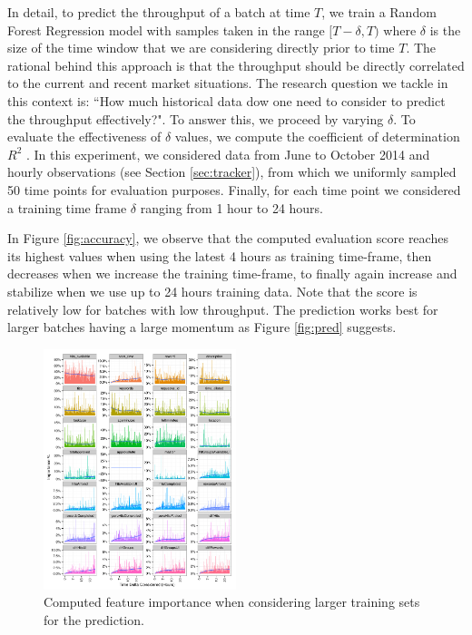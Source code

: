 In detail, to predict the throughput of a batch at time $T$, we train a Random Forest Regression model with samples taken in the range $[T-\delta, T)$ where $\delta$ is the size of the time window that we are   considering directly prior to time $T$. The rational behind this approach is that the throughput should be directly correlated to the current and recent market situations. 
The research question we tackle in this context is: ``How much historical data dow one need to consider to predict the throughput effectively?". To answer this, we proceed by varying $\delta$.
To evaluate the effectiveness of $\delta$ values, we compute the coefficient of determination  $R^2$ \cite{sklearnweb, sklearn}.
In this experiment, we considered  data from June to October 2014 and hourly observations (see Section \ref{sec:tracker}), from which we uniformly sampled 50 time points for evaluation purposes. Finally, for each time point we considered a training time frame $\delta$ ranging from 1 hour to 24 hours. 

In Figure \ref{fig:accuracy}, we observe that the computed evaluation score reaches its highest values when using the latest 4 hours as training time-frame, then decreases when we increase the training time-frame, to finally again increase and stabilize when we use up to 24 hours training data.
Note that the score is relatively low for batches with low throughput. The prediction works best for larger batches having a large momentum as Figure \ref{fig:pred} suggests.



\begin{figure}[tb]
	\centering
		\includegraphics[width=0.5\textwidth]{figures/importances}
	\caption{Computed feature importance when considering larger training sets for the prediction.}
	\label{fig:importances}
\end{figure}



